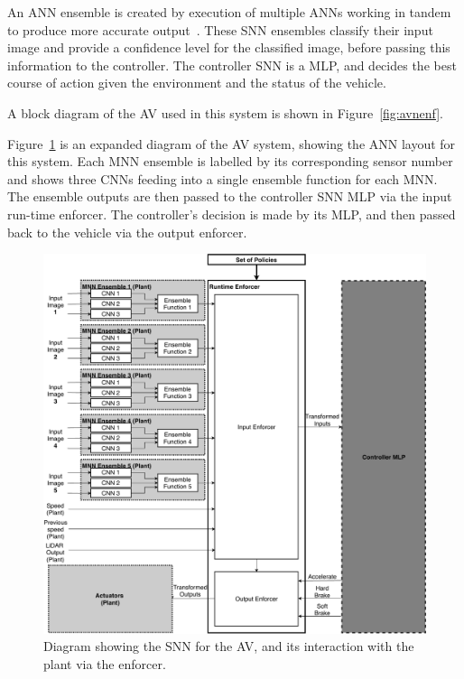 An \ac{ANN} ensemble is created by execution of multiple \acp{ANN} working in tandem to produce more accurate output~\cite{Maqsood2004}.
These \ac{SNN} ensembles classify their input image and provide a confidence level for the classified image, before passing this information to the controller.
The controller \ac{SNN} is a \ac{MLP}, and decides the best course of action given the environment and the status of the vehicle. 
A block diagram of the \ac{AV} used in this system is shown in Figure~\ref{fig:avnenf}. 

Figure~\ref{fig:avmnn} is an expanded diagram of the \ac{AV} system, showing the \ac{ANN} layout for this system.
Each \ac{MNN} ensemble is labelled by its corresponding sensor number and shows three \acp{CNN} feeding into a single ensemble function for each \ac{MNN}.
The ensemble outputs are then passed to the controller \ac{SNN} \ac{MLP} via the input run-time enforcer.
The controller's decision is made by its \ac{MLP}, and then passed back to the vehicle via the output enforcer.

\begin{figure}[H]
	\centering
	\includegraphics[width=\textwidth]{Content/fig/AV-MNN.pdf}
	\caption{Diagram showing the \ac{SNN} for the \ac{AV}, and its interaction with the plant via the enforcer. \label{fig:avmnn}}
\end{figure}


